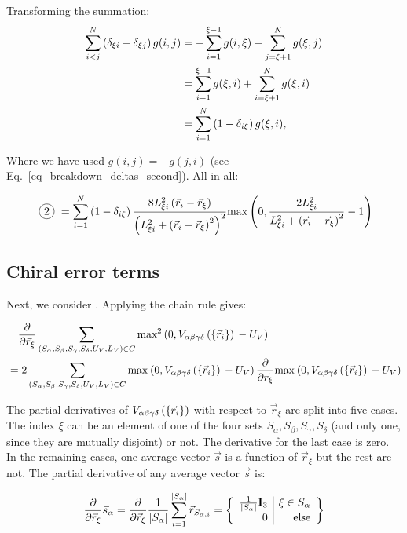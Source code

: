 \documentclass[a4paper]{article}
\newcommand*\circled[1]{
  \tikz[baseline=(char.base)]{
    \node[shape=circle,draw,inner sep=2pt] (char) {#1};
  }
}
\begin{document}
Transforming the summation:
\begin{align}
  \sum_{i < j}^{N} \left( \delta_{\xi i} - \delta_{\xi j} \right) g(i, j)
  &= - \sum_{i = 1}^{\xi - 1} g(i, \xi) 
    + \sum_{j = \xi + 1}^{N} g(\xi, j)\\
  &= \sum_{i = 1}^{\xi - 1} g(\xi, i) 
    + \sum_{i = \xi + 1}^{N} g(\xi, i)\\
  &= \sum_{i = 1}^{N} \left(1 - \delta_{i\xi} \right) g(\xi, i),
\end{align}

Where we have used $g(i, j) = -g(j, i)$ (see
Eq.~\ref{eq_breakdown_deltas_second}). All in all:

\begin{equation}
  \text{\circled{2}}
  = \iNSum \left(1 - \delta_{i\xi}\right) 
    \frac{
      8 L_{\xi i}^{2} \posVecDiff{i}{\xi}
    }{
      \left(
        L_{\xi i}^{2} + \posVecDiff{i}{\xi}^2
      \right)^2
    } \textrm{max} \left(
      0,
      \frac{
        2 L_{\xi i}^{2}
      }{
        L_{\xi i}^{2} + \posVecDiff{i}{\xi}^{2}
      } - 1
    \right)
\end{equation}

\subsection{Chiral error terms}

Next, we consider \circled{3}. Applying the chain rule gives:

\begin{align*}
  &\quad\frac{\partial}{\partial\vec{r}_{\xi}} \sum_{\left(S_\alpha, S_\beta, S_\gamma, S_\delta, U_{V}, L_{V}\right) \in{} C} \textrm{max}^{2} \left(0, V_{\alpha\beta\gamma\delta}\left(\left\{\vec{r}_i \right\}\right){}-U_{V} \right)\\
  &= 2 \sum_{\left(S_\alpha, S_\beta, S_\gamma, S_\delta, U_{V}, L_{V}\right) \in{} C} \textrm{max}^{} \left(0, V_{\alpha\beta\gamma\delta}\left(\left\{\vec{r}_i \right\}\right){}-U_{V} \right) \frac{\partial}{\partial\vec{r}_{\xi}} \textrm{max}^{} \left(0, V_{\alpha\beta\gamma\delta}\left(\left\{\vec{r}_i \right\}\right){}-U_{V} \right)
\end{align*}

The partial derivatives of $V_{\alpha\beta\gamma\delta}\left(\left\{\vec{r}_i \right\}\right)$ with
respect to $\vec{r}_\xi$ are split into five cases. The index $\xi$ can be an
element of one of the four sets $S_\alpha, S_\beta, S_\gamma, S_\delta$ (and
only one, since they are mutually disjoint) or not. The derivative for the last
case is zero. In the remaining cases, one average vector $\vec{s}$ is a function
of $\vec{r}_\xi$ but the rest are not. The partial derivative of any average
vector $\vec{s}$ is:

\begin{equation}
  \frac{\partial}{\partial\vec{r}_{\xi}} \vec{s}_\alpha 
  = \frac{\partial}{\partial\vec{r}_{\xi}} \frac{1}{|S_\alpha|}\sum_{i=1}^{|S_\alpha|}
  \vec{r}_{S_{\alpha, i}}
  = \left\{ 
    \begin{array}{r | r}
      \frac{1}{|S_\alpha|} \mathbf{I}_3 &  \xi \in S_\alpha\\
      0 & \textrm{else}
    \end{array}
  \right\}
\end{equation}
\end{document}
